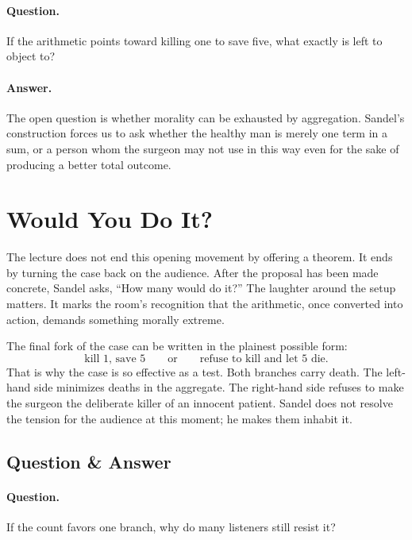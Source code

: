\paragraph{Question.} If the arithmetic points toward killing one to save five, what exactly is left to object to?

\paragraph{Answer.} The open question is whether morality can be exhausted by aggregation. Sandel's construction forces us to ask whether the healthy man is merely one term in a sum, or a person whom the surgeon may not use in this way even for the sake of producing a better total outcome.

\section{Would You Do It?}

The lecture does not end this opening movement by offering a theorem. It ends by turning the case back on the audience. After the proposal has been made concrete, Sandel asks, ``How many would do it?'' The laughter around the setup matters. It marks the room's recognition that the arithmetic, once converted into action, demands something morally extreme.

The final fork of the case can be written in the plainest possible form:
\begin{equation}
\text{kill }1\text{, save }5
\qquad \text{or} \qquad
\text{refuse to kill and let }5\text{ die}.
\end{equation}
That is why the case is so effective as a test. Both branches carry death. The left-hand side minimizes deaths in the aggregate. The right-hand side refuses to make the surgeon the deliberate killer of an innocent patient. Sandel does not resolve the tension for the audience at this moment; he makes them inhabit it.

\subsection{Question \& Answer}

\paragraph{Question.} If the count favors one branch, why do many listeners still resist it?

